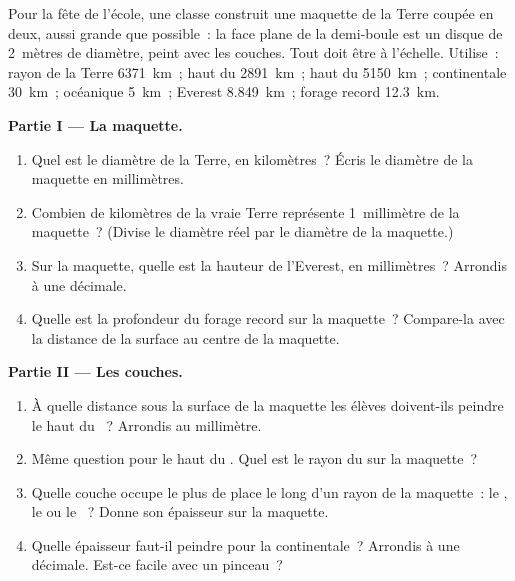 \begin{problem}
\label{pb:g6:inside-the-earth:1}
Pour la fête de l'école, une classe construit une maquette de la Terre
coupée en deux, aussi grande que possible~: la face plane de la
demi-boule est un disque de 2~mètres de diamètre, peint avec les couches.
Tout doit être à l'échelle. Utilise~: rayon de la Terre 6371~km~; haut du
 2891~km~; haut du  5150~km~; 
continentale 30~km~;  océanique 5~km~; Everest 8.849~km~; forage
record 12.3~km.

\medskip
\noindent\textbf{Partie I --- La maquette.}
\begin{enumerate}
  \item Quel est le diamètre de la Terre, en kilomètres~? Écris le diamètre
        de la maquette en millimètres.
  \item Combien de kilomètres de la vraie Terre représente 1~millimètre de
        la maquette~? (Divise le diamètre réel par le diamètre de la
        maquette.)
  \item Sur la maquette, quelle est la hauteur de l'Everest, en
        millimètres~? Arrondis à une décimale.
  \item Quelle est la profondeur du forage record sur la maquette~?
        Compare-la avec la distance de la surface au centre de la maquette.
\end{enumerate}

\medskip
\noindent\textbf{Partie II --- Les couches.}
\begin{enumerate}[resume]
  \item À quelle distance sous la surface de la maquette les élèves
        doivent-ils peindre le haut du ~? Arrondis au
        millimètre.
  \item Même question pour le haut du . Quel est le rayon du
         sur la maquette~?
  \item Quelle couche occupe le plus de place le long d'un rayon de la
        maquette~: le , le  ou le ~? Donne
        son épaisseur sur la maquette.
  \item Quelle épaisseur faut-il peindre pour la  continentale~?
        Arrondis à une décimale. Est-ce facile avec un pinceau~?
\end{enumerate}


\end{problem}
